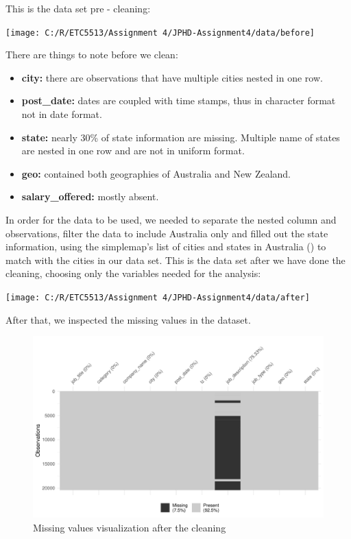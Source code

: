 \documentclass[11pt,a4paper,]{article}
\providecommand{\tightlist}{%
  \setlength{\itemsep}{0pt}\setlength{\parskip}{0pt}}
\begin{document}
This is the data set pre - cleaning:

\texttt{[image: C:/R/ETC5513/Assignment 4/JPHD-Assignment4/data/before]}

There are things to note before we clean:

\begin{itemize}
\tightlist
\item
  \textbf{city:} there are observations that have multiple cities nested in one row.
\item
  \textbf{post\_date:} dates are coupled with time stamps, thus in character format not in date format.
\item
  \textbf{state:} nearly 30\% of state information are missing. Multiple name of states are nested in one row and are not in uniform format.
\item
  \textbf{geo:} contained both geographies of Australia and New Zealand.
\item
  \textbf{salary\_offered:} mostly absent.
\end{itemize}

In order for the data to be used, we needed to separate the nested column and observations, filter the data to include Australia only and filled out the state information, using the simplemap's list of cities and states in Australia (\textcite{simplemaps_2019}) to match with the cities in our data set.
This is the data set after we have done the cleaning, choosing only the variables needed for the analysis:

\texttt{[image: C:/R/ETC5513/Assignment 4/JPHD-Assignment4/data/after]}

After that, we inspected the missing values in the dataset.

\begin{figure}
\centering
\includegraphics{Team_JHDP_Assignment4_files/figure-latex/missing-1.pdf}
\caption{\label{fig:missing}Missing values visualization after the cleaning}
\end{figure}
\end{document}
